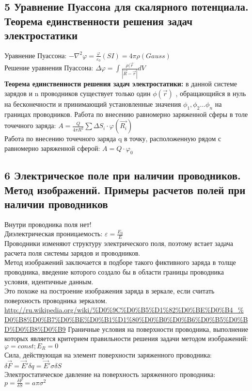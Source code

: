 \documentclass[a4paper,12pt]{article}
\begin{document}
\subsection{5   Уравнение Пуассона для скалярного потенциала. Теорема единственности решения  задач электростатики}
Уравнение Пуассона: $ - \nabla ^2 \varphi = \frac{\varphi}{\varepsilon _0} (SI)  = 4 \pi \rho (Gauss)$\\
Решение уравнения Пуассона: $\Delta \varphi = \int \frac{\rho (\vec{r}}{|\vec{R} - \vec{r}|} dV$\\
\textbf{Теорема единственности решения задач электростатики:} в данной системе зарядов и n проводников существует только один
$ \phi(\vec{r}) $
, обращающийся в нуль на бесконечности и принимающий установленные значения 
$ \phi_1, \phi_2... \phi_n $
на границах проводников.
Работа по внесению равномерно заряженной сферы в толе точечного заряда: $A = \frac{Q}{4 \pi R^2} \sum \Delta S_i \cdot \varphi (\vec{R_i} )$\\
Работа по внесению точечного заряда q в точку, расположенную рядом с равномерно заряженной сферой: $A = Q \cdot \varphi _0$

\subsection{6   Электрическое поле при наличии проводников. Метод изображений. Примеры расчетов полей при наличии проводников}
Внутри проводника поля нет!\\
Диэлектрическая проницаемость: $\varepsilon = \frac{E_0}{E}$\\
Проводники изменяют структуру электрического поля, поэтому встает задача расчета поля системы зарядов и проводников. \\
Метод изображений заключается в подборе такого фиктивного заряда в толще проводника, введение которого создало бы в области границы проводника условия, идентичные данным. \\
Это похоже на построение изображения заряда в зеркале, если считать поверхность проводника зеркалом. \\
\url{http://ru.wikipedia.org/wiki/%D0%9C%D0%B5%D1%82%D0%BE%D0%B4_%D0%B8%D0%B7%D0%BE%D0%B1%D1%80%D0%B0%D0%B6%D0%B5%D0%BD%D0%B8%D0%B9}
Граничные условия на поверхности проводника, выполнение которых является критерием правильности решения задачи методом изображений: $\varphi = const; E_R = 0$\\
Сила, действующая на элемент поверхности заряженного проводника: $\delta \vec{F} = \vec{E}' \delta q = \vec{E}' \sigma \delta S$\\
Электростатическое давление на поверхность заряженного проводника: $p = \frac{\delta F}{\delta S} = a \pi \sigma ^2$\\
\end{document}
